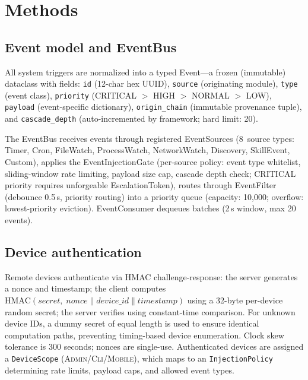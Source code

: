 \documentclass[pdflatex,sn-nature]{sn-jnl}%
\theoremstyle{thmstyleone}%
\theoremstyle{thmstyletwo}%
\theoremstyle{thmstylethree}%
\begin{document}
\section{Methods}\label{sec:methods}

\subsection{Event model and EventBus}\label{subsec:meth-eventbus}

All system triggers are normalized into a typed Event---a frozen (immutable) dataclass with fields: \texttt{id} (12-char hex UUID), \texttt{source} (originating module), \texttt{type} (event class), \texttt{priority} (CRITICAL $>$ HIGH $>$ NORMAL $>$ LOW), \texttt{payload} (event-specific dictionary), \texttt{origin\_chain} (immutable provenance tuple), and \texttt{cascade\_depth} (auto-incremented by framework; hard limit: 20).

The EventBus receives events through registered EventSources (8~source types: Timer, Cron, FileWatch, ProcessWatch, NetworkWatch, Discovery, SkillEvent, Custom), applies the EventInjectionGate (per-source policy: event type whitelist, sliding-window rate limiting, payload size cap, cascade depth check; CRITICAL priority requires unforgeable EscalationToken), routes through EventFilter (debounce 0.5\,s, priority routing) into a priority queue (capacity: 10,000; overflow: lowest-priority eviction). EventConsumer dequeues batches (2\,s window, max 20 events).

\subsection{Device authentication}\label{subsec:meth-device}

Remote devices authenticate via HMAC challenge-response: the server generates a nonce and timestamp; the client computes $\text{HMAC}(\textit{secret},\; \textit{nonce} \| \textit{device\_id} \| \textit{timestamp})$ using a 32-byte per-device random secret; the server verifies using constant-time comparison. For unknown device IDs, a dummy secret of equal length is used to ensure identical computation paths, preventing timing-based device enumeration. Clock skew tolerance is 300 seconds; nonces are single-use. Authenticated devices are assigned a \texttt{DeviceScope} (\textsc{Admin}/\textsc{Cli}/\textsc{Mobile}), which maps to an \texttt{InjectionPolicy} determining rate limits, payload caps, and allowed event types.
\end{document}
